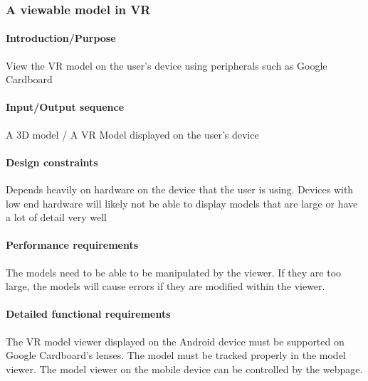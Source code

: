 \documentclass[letterpaper, 10pt, draftclsnofoot, compsoc, onecolumn]{IEEEtran}
\begin{document}
\subsubsection[{Google Cardboard}]{\rmfamily\bfseries\color{black} 
	A viewable model in VR 
}

\paragraph[Introduction/Purpose of this
feature]{\rmfamily\bfseries\color{black}
Introduction/Purpose }
{\color{black}
	View the VR model on the user's device using peripherals such as Google Cardboard   
}

\paragraph[Input/Output sequence]{\rmfamily\bfseries\color{black}
Input/Output sequence }
{\color{black}
	A 3D model / A VR Model displayed on the user's device  
}

\paragraph[Design constraints]{\rmfamily\bfseries\color{black} Design
constraints }
{\color{black}
	Depends heavily on hardware on the device that the user is using. Devices with low end hardware will likely not be able to 
	display models that are large or have a lot of detail very well  
}

\paragraph[Performance requirements]{\rmfamily\bfseries\color{black}
Performance requirements }
{\color{black}
	The models need to be able to be manipulated by the viewer. If they are too large, the models will cause errors if they are 
	modified within the viewer.  
}

\paragraph[Detailed functional requirements]{\rmfamily\bfseries\color{black}
Detailed functional requirements }
{\color{black}
	The VR model viewer displayed on the Android device must be supported on Google Cardboard's lenses. The model must 
	be tracked properly in the model viewer. The model viewer on the mobile device can be controlled by the webpage.  
}
\end{document}
